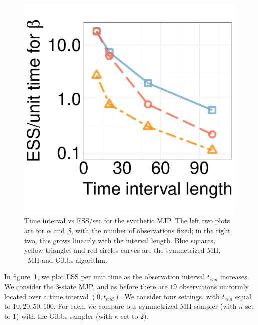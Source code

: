 \begin{figure}[H]
\begin{minipage}[hp]{0.24\linewidth}
      \end{minipage}
  \begin{minipage}[hp]{0.24\linewidth}
  \centering
    \includegraphics [width=0.99\textwidth, angle=0]{figs/new_experiment_figs/ESS_vs_t_beta.pdf}
  \end{minipage}
  \caption{Time interval vs ESS/sec for the synthetic MJP. The left two plots are for $\alpha$ and $\beta$, with the number of observations fixed; in the right two, this grows linearly with the interval length. {Blue squares, yellow triangles and red circles curves} are the symmetrized MH, \naive\ MH and Gibbs algorithm.
  }
     \label{fig:TSS}
  \end{figure}
In figure~\ref{fig:TSS}, we plot ESS per unit time as the observation interval $t_{end}$ increases. 
We consider the 3-state MJP, and as before there are $19$ observations uniformly located over a time interval $(0,t_{end})$.
We consider four settings, with $t_{end}$ equal to $10, 20, 50, 100$. 
For each, we compare our symmetrized MH sampler (with $\kappa$ set to $1$) with the Gibbs sampler (with $\kappa$ set to $2$). 
